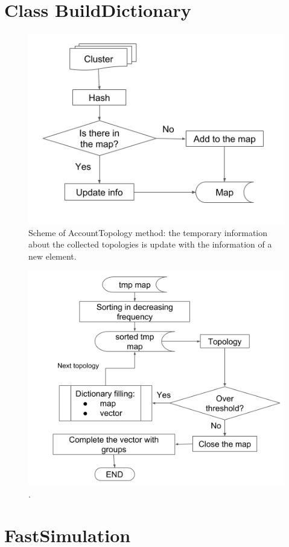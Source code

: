 \section{Class BuildDictionary}
%
\begin{figure}
  \centering
  \includegraphics[scale=0.6]{figures/account.png}
  \caption{Scheme of AccountTopology method: the temporary information about the collected topologies is update with the information of a new element.}
  \label{fig:account}
\end{figure}
%
\begin{figure}
  \centering
  \includegraphics[scale=0.6]{figures/build.png}
  \caption{.}
  \label{fig:build}
\end{figure}
%

\section{FastSimulation}
\label{fast}